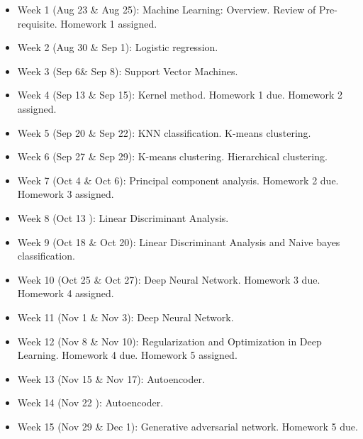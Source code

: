 \documentclass[a4paper,10pt]{article}
\begin{document}
\begin{itemize}

\item Week 1 (Aug 23 \& Aug 25): Machine Learning: Overview.  Review of Pre-requisite. Homework 1 assigned. 

\item Week 2 (Aug 30 \& Sep 1): Logistic regression. 

\item Week 3 (Sep 6\& Sep 8):  Support Vector Machines. 

\item Week 4 (Sep 13 \& Sep 15): Kernel method. Homework 1 due. Homework 2 assigned.

\item Week 5 (Sep 20 \& Sep 22): KNN classification. K-means clustering. 

\item Week 6 (Sep 27 \& Sep 29): K-means clustering. Hierarchical clustering. 

\item Week 7 (Oct 4 \& Oct 6): Principal component analysis. Homework 2 due. Homework 3 assigned.

\item Week 8 (Oct 13 ):  Linear Discriminant Analysis. 

\item Week 9 (Oct 18 \& Oct 20):  Linear Discriminant Analysis and Naive bayes classification. 

\item Week 10 (Oct 25 \& Oct 27):  Deep Neural Network.  Homework 3 due. Homework 4 assigned.

\item Week 11 (Nov 1 \& Nov 3):   Deep Neural Network. 

\item Week 12 (Nov 8 \& Nov 10): Regularization and Optimization in Deep Learning.  Homework 4 due. Homework 5 assigned. 

\item Week 13 (Nov 15 \& Nov 17):  Autoencoder.

\item Week 14 (Nov 22 ): Autoencoder.

\item Week 15 (Nov 29 \& Dec 1): Generative adversarial network. Homework 5 due. 
 
\end{itemize}
\end{document}
